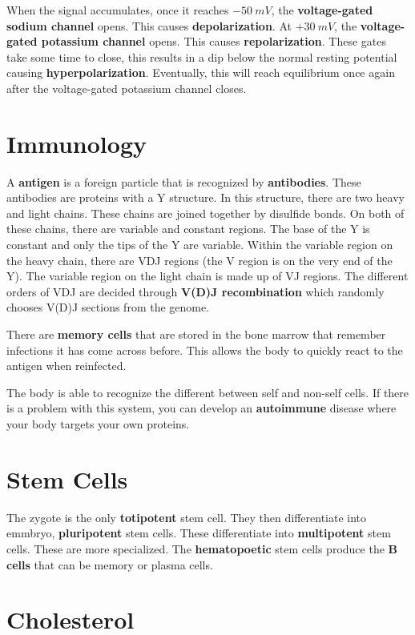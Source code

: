 \documentclass{article}
\begin{document}
When the signal accumulates, once it reaches $-50\ \si{ mV }$, the
\textbf{voltage-gated sodium channel} opens. This causes
\textbf{depolarization}. At $+30\ \si{ mV }$, the \textbf{voltage-gated
potassium channel} opens. This causes \textbf{repolarization}.  These gates take
some time to close, this results in a dip below the normal resting potential
causing \textbf{hyperpolarization}. Eventually, this will reach equilibrium once
again after the voltage-gated potassium channel closes.

\section{Immunology}

A \textbf{antigen} is a foreign particle that is recognized by
\textbf{antibodies}. These antibodies are proteins with a Y structure. In this
structure, there are two heavy and light chains. These chains are joined
together by disulfide bonds. On both of these chains, there are variable and
constant regions. The base of the Y is constant and only the tips of the Y are
variable. Within the variable region on the heavy chain, there are VDJ regions
(the V region is on the very end of the Y). The variable region on the light
chain is made up of VJ regions. The different orders of VDJ are decided through
\textbf{V(D)J recombination} which randomly chooses V(D)J sections from the
genome.

There are \textbf{memory cells} that are stored in the bone marrow that remember
infections it has come across before. This allows the body to quickly react to
the antigen when reinfected.

The body is able to recognize the different between self and non-self cells. If
there is a problem with this system, you can develop an \textbf{autoimmune}
disease where your body targets your own proteins.

\section{Stem Cells}

The zygote is the only \textbf{totipotent} stem cell. They then differentiate
into emmbryo, \textbf{pluripotent} stem cells. These differentiate into
\textbf{multipotent} stem cells. These are more specialized. The
\textbf{hematopoetic} stem cells produce the \textbf{B cells} that can be
memory or plasma cells.

\section{Cholesterol}
\end{document}
